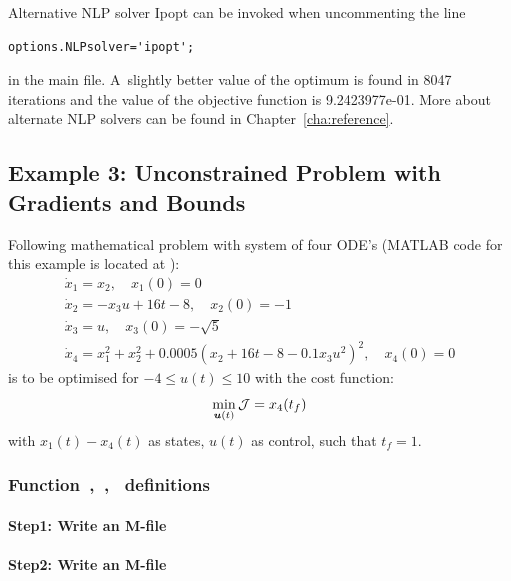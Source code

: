Alternative NLP solver Ipopt can be invoked when uncommenting the line 
\begin{verbatim}
options.NLPsolver='ipopt';
\end{verbatim}
in the main file. A~slightly better value of the optimum is found in
8047 iterations and the value of the objective function is
9.2423977e-01. More about alternate NLP solvers can be found in
Chapter~\ref{cha:reference}.

\subsection{Example 3: Unconstrained Problem  with Gradients and Bounds}
\label{sec:unconprobgradbound}

Following mathematical problem \citep{raj01,luu90_51} with system of
four ODE's (MATLAB code for this example is located at
):
\begin{gather}
\dot{x}_1 = x_{2}, \quad x_{1}(0) = 0\\
\dot{x}_2 = -x_{3}u + 16t - 8, \quad x_{2}(0) = -1\\
\dot{x}_3 = u, \quad x_{3}(0) = -\sqrt{5}\\
\dot{x}_4 = x_{1}^{2} + x_{2}^{2} + 0.0005(x_{2} + 16t - 8 -
0.1x_{3}u^{2})^{2}, \quad x_{4}(0) = 0
\end{gather} is to be optimised for $-4 \leq u(t) \leq 10$ with the
cost function:  
\begin{equation}
\min_{\ve{u}(t)} \mf{J} = x_{4}(t_{f}) \label{eq:ucpgb}
\end{equation} with $x_1(t) - x_4(t)$ as states, $u(t)$ as control,
such that $t_{f}=1$. 

\subsubsection{Function~,~,~  definitions}
\label{sec:unconprbgradbound-fundef}

\paragraph{Step1: Write an M-file~}

{\small }

\paragraph{Step2: Write an M-file~}

